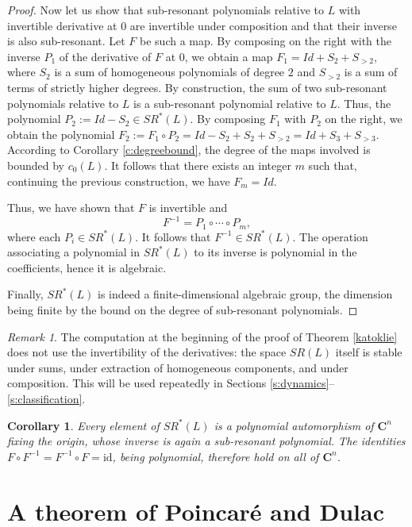 \documentclass[english,11pt]{amsart}
\newtheorem{corollary}[theorem]{Corollary}
\theoremstyle{definition}
\theoremstyle{remark}
\newtheorem{remark}[theorem]{Remark}
\numberwithin{equation}{section}
\newcommand{\C}{\mathbf{C}}
\begin{document}
\begin{proof}
Now let us show that sub-resonant polynomials relative to $L$ with invertible derivative at $0$ are invertible under composition and that their inverse is also sub-resonant. Let $F$ be such a map. By composing on the right with the inverse $P_1$ of the derivative of $F$ at $0$, we obtain a map $F_1 = Id + S_2 + S_{>2}$, where $S_2$ is a sum of homogeneous polynomials of degree $2$ and $S_{>2}$ is a sum of terms of strictly higher degrees. By construction, the sum of two sub-resonant polynomials relative to $L$ is a sub-resonant polynomial relative to $L$. Thus, the polynomial $P_2 := Id - S_2 \in SR^*(L)$. By composing $F_1$ with $P_2$ on the right, we obtain the polynomial $F_2 := F_1 \circ P_2 = Id - S_2 + S_2 + S_{>2} = Id + S_3 + S_{>3}$. According to Corollary \ref{c:degreebound}, the degree of the maps involved is bounded by $c_0(L)$. It follows that there exists an integer $m$ such that, continuing the previous construction, we have $F_m = Id$.

Thus, we have shown that $F$ is invertible and
$$
F^{-1} = P_1 \circ \cdots \circ P_m,
$$
where each $P_i \in SR^*(L)$. It follows that $F^{-1} \in SR^*(L)$. The operation associating a polynomial in $SR^*(L)$ to its inverse is polynomial in the coefficients, hence it is algebraic.

Finally, $SR^*(L)$ is indeed a finite-dimensional algebraic group, the dimension being finite by the bound on the degree of sub-resonant polynomials.

\end{proof}

\begin{remark}\label{r:noinvert}
The computation at the beginning of the proof of Theorem \ref{katoklie} does not use the invertibility of the derivatives: the space $SR(L)$ itself is stable under sums, under extraction of homogeneous components, and under composition. This will be used repeatedly in Sections \ref{s:dynamics}--\ref{s:classification}.
\end{remark}

\begin{corollary}\label{c:autpol}
Every element of $SR^*(L)$ is a polynomial automorphism of $\C^n$ fixing the origin, whose inverse is again a sub-resonant polynomial. The identities $F\circ F^{-1}=F^{-1}\circ F=\mathrm{id}$, being polynomial, therefore hold on all of $\C^n$.
\end{corollary}

\section{
A theorem of Poincar\'e and Dulac}\label{s:pd}
\end{document}
